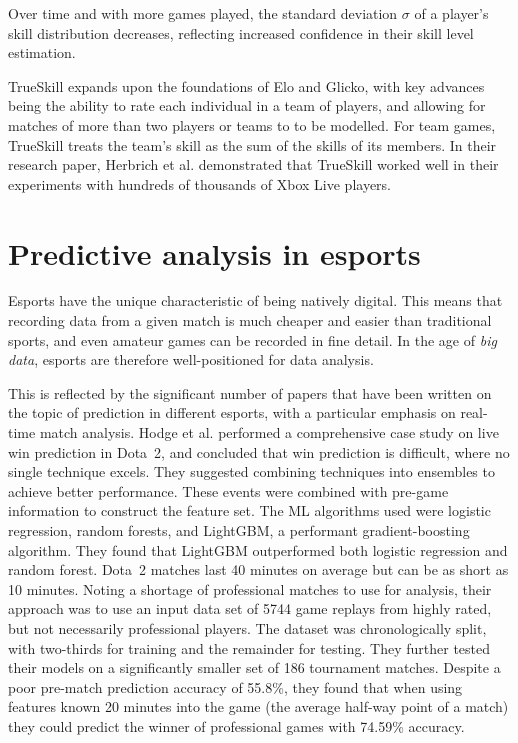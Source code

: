 Over time and with more games played, the standard deviation $\sigma$ of a player's skill distribution decreases, reflecting increased confidence in their skill level estimation.

TrueSkill\texttrademark{} expands upon the foundations of Elo and Glicko, with key advances being the ability to rate each individual in a team of players, and allowing for matches of more than two players or teams to to be modelled. For team games, TrueSkill treats the team's skill as the sum of the skills of its members. In their research paper, Herbrich et al.  \cite{trueskill} demonstrated that TrueSkill worked well in their experiments with hundreds of thousands of Xbox Live players.

\section{Predictive analysis in esports}

Esports have the unique characteristic of being natively digital. This means that recording data from a given match is much cheaper and easier than traditional sports, and even amateur games can be recorded in fine detail. In the age of \textit{big data}, esports are therefore well-positioned for data analysis. 

This is reflected by the significant number of papers that have been written on the topic of prediction in different esports, with a particular emphasis on real-time match analysis. Hodge et al. \cite{livematchprediction} performed a comprehensive case study on live win prediction in Dota~2, and concluded that win prediction is difficult, where no single technique excels. They suggested combining techniques into ensembles to achieve better performance. These events were combined with pre-game information to construct the feature set. The ML algorithms used were logistic regression, random forests, and LightGBM, a performant gradient-boosting algorithm. They found that LightGBM outperformed both logistic regression and random forest. Dota~2 matches last 40 minutes on average but can be as short as 10 minutes. Noting a shortage of professional matches to use for analysis, their approach was to use an input data set of 5744 game replays from highly rated, but not necessarily professional players. The dataset was chronologically split, with two-thirds for training and the remainder for testing. They further tested their models on a significantly smaller set of 186 tournament matches. Despite a poor pre-match prediction accuracy of 55.8\%, they found that when using features known 20 minutes into the game (the average half-way point of a match) they could predict the winner of professional games with 74.59\% accuracy.

